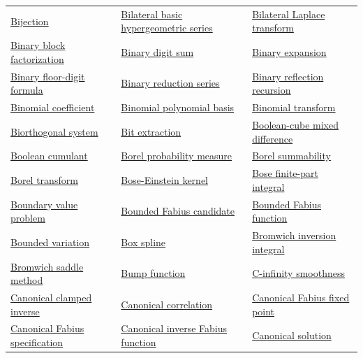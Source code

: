 \documentclass[11pt,oneside]{article}
\begin{document}
\begin{longtable}{L{0.31\textwidth}L{0.31\textwidth}L{0.31\textwidth}}
\hyperlink{gls:bijection}{Bijection} & \hyperlink{gls:bilateral-basic-hypergeometric-series}{Bilateral basic hypergeometric series} & \hyperlink{gls:bilateral-laplace-transform}{Bilateral Laplace transform} \\
\hyperlink{gls:binary-block-factorization}{Binary block factorization} & \hyperlink{gls:binary-digit-sum}{Binary digit sum} & \hyperlink{gls:binary-expansion}{Binary expansion} \\
\hyperlink{gls:binary-floor-digit-formula}{Binary floor-digit formula} & \hyperlink{gls:binary-reduction-series}{Binary reduction series} & \hyperlink{gls:binary-reflection-recursion}{Binary reflection recursion} \\
\hyperlink{gls:binomial-coefficient}{Binomial coefficient} & \hyperlink{gls:binomial-basis}{Binomial polynomial basis} & \hyperlink{gls:binomial-transform}{Binomial transform} \\
\hyperlink{gls:biorthogonal-system}{Biorthogonal system} & \hyperlink{gls:bit-extraction}{Bit extraction} & \hyperlink{gls:boolean-cube-difference}{Boolean-cube mixed difference} \\
\hyperlink{gls:boolean-cumulant}{Boolean cumulant} & \hyperlink{gls:borel-probability-measure}{Borel probability measure} & \hyperlink{gls:borel-summability}{Borel summability} \\
\hyperlink{gls:borel-transform}{Borel transform} & \hyperlink{gls:bose-einstein-kernel}{Bose-Einstein kernel} & \hyperlink{gls:bose-finite-part-integral}{Bose finite-part integral} \\
\hyperlink{gls:boundary-value-problem}{Boundary value problem} & \hyperlink{gls:bounded-fabius-candidate}{Bounded Fabius candidate} & \hyperlink{gls:bounded-fabius-function}{Bounded Fabius function} \\
\hyperlink{gls:bounded-variation}{Bounded variation} & \hyperlink{gls:box-spline}{Box spline} & \hyperlink{gls:bromwich-inversion-integral}{Bromwich inversion integral} \\
\hyperlink{gls:bromwich-saddle-method}{Bromwich saddle method} & \hyperlink{gls:bump-function}{Bump function} & \hyperlink{gls:c-infinity-smoothness}{C-infinity smoothness} \\
\hyperlink{gls:canonical-clamped-inverse}{Canonical clamped inverse} & \hyperlink{gls:canonical-correlation}{Canonical correlation} & \hyperlink{gls:canonical-fabius-fixed-point}{Canonical Fabius fixed point} \\
\hyperlink{gls:fabius-specification}{Canonical Fabius specification} & \hyperlink{gls:canonical-fabius-inverse}{Canonical inverse Fabius function} & \hyperlink{gls:canonical-solution}{Canonical solution} \\

\end{longtable}
\end{document}
